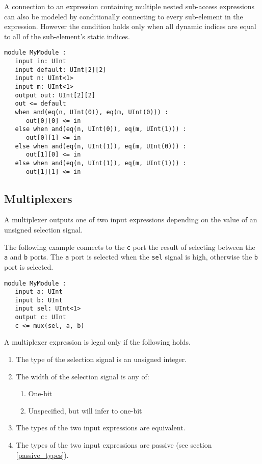 \documentclass[12pt]{article}
\begin{document}
A connection to an expression containing multiple nested sub-access expressions can also be modeled by conditionally connecting to every sub-element in the expression. However the condition holds only when all dynamic indices are equal to all of the sub-element's static indices.
\begin{lstlisting}
module MyModule :
   input in: UInt
   input default: UInt[2][2]
   input n: UInt<1>
   input m: UInt<1>
   output out: UInt[2][2]
   out <= default
   when and(eq(n, UInt(0)), eq(m, UInt(0))) :
      out[0][0] <= in
   else when and(eq(n, UInt(0)), eq(m, UInt(1))) :
      out[0][1] <= in
   else when and(eq(n, UInt(1)), eq(m, UInt(0))) :
      out[1][0] <= in
   else when and(eq(n, UInt(1)), eq(m, UInt(1))) :
      out[1][1] <= in
\end{lstlisting}

\subsection{Multiplexers}\label{multiplexers}

A multiplexer outputs one of two input expressions depending on the value of an unsigned selection signal.

The following example connects to the \verb|c| port the result of selecting between the \verb|a| and \verb|b| ports. The \verb|a| port is selected when the \verb|sel| signal is high, otherwise the \verb|b| port is selected.
\begin{lstlisting}
module MyModule :
   input a: UInt
   input b: UInt
   input sel: UInt<1>
   output c: UInt
   c <= mux(sel, a, b)
\end{lstlisting}

A multiplexer expression is legal only if the following holds.
\begin{enumerate}
\item The type of the selection signal is an unsigned integer.
\item The width of the selection signal is any of:
  \begin{enumerate}
  \item One-bit
  \item Unspecified, but will infer to one-bit
  \end{enumerate}
\item The types of the two input expressions are equivalent.
\item The types of the two input expressions are passive (see section \ref{passive_types}).
\end{enumerate}
\end{document}
